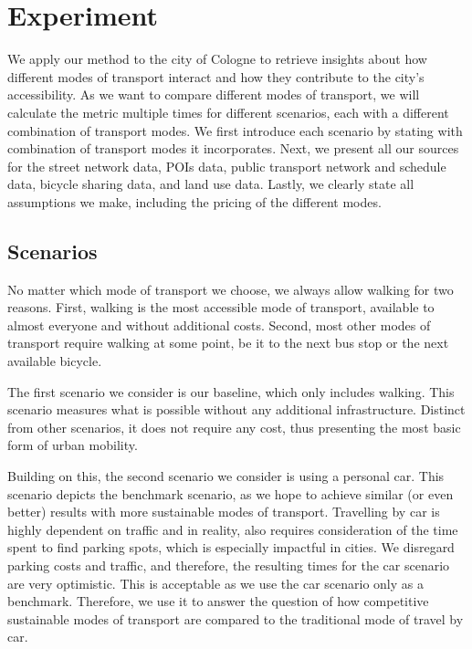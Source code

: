 \clearpage
\section{Experiment}
\label{sec:experiment}

We apply our method to the city of Cologne to retrieve insights about how different modes of transport interact and how they contribute to the city's accessibility.
As we want to compare different modes of transport, we will calculate the metric multiple times for different scenarios, each with a different combination of transport modes.
We first introduce each scenario by stating with combination of transport modes it incorporates. 
Next, we present all our sources for the street network data, POIs data, public transport network and schedule data, bicycle sharing data, and land use data.
Lastly, we clearly state all assumptions we make, including the pricing of the different modes.

\subsection{Scenarios}
\label{subs:scenarios}

No matter which mode of transport we choose, we always allow walking for two reasons.
First, walking is the most accessible mode of transport, available to almost everyone and without additional costs.
Second, most other modes of transport require walking at some point, be it to the next bus stop or the next available bicycle.

The first scenario we consider is our baseline, which only includes walking.
This scenario measures what is possible without any additional infrastructure. 
Distinct from other scenarios, it does not require any cost, thus presenting the most basic form of urban mobility.

Building on this, the second scenario we consider is using a personal car.
This scenario depicts the benchmark scenario, as we hope to achieve similar (or even better) results with more sustainable modes of transport.
Travelling by car is highly dependent on traffic and in reality, also requires consideration of the time spent to find parking spots, which is especially impactful in cities.
We disregard parking costs and traffic, and therefore, the resulting times for the car scenario are very optimistic.
This is acceptable as we use the car scenario only as a benchmark.
Therefore, we use it to answer the question of how competitive sustainable modes of transport are compared to the traditional mode of travel by car. 

